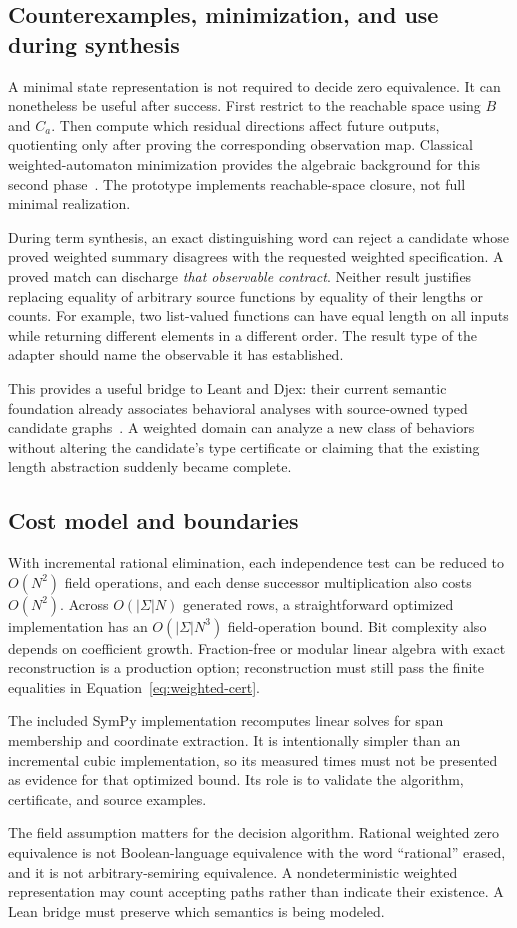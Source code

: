 \subsection{Counterexamples, minimization, and use during synthesis}

A minimal state representation is not required to decide zero equivalence.
It can nonetheless be useful after success. First restrict to the reachable
space using $B$ and $C_a$. Then compute which residual directions affect future
outputs, quotienting only after proving the corresponding observation map.
Classical weighted-automaton minimization provides the algebraic background
for this second phase~\cite{kiefer}. The prototype implements reachable-space
closure, not full minimal realization.

During term synthesis, an exact distinguishing word can reject a candidate
whose proved weighted summary disagrees with the requested weighted
specification. A proved match can discharge \emph{that observable contract}.
Neither result justifies replacing equality of arbitrary source functions by
equality of their lengths or counts. For example, two list-valued functions can
have equal length on all inputs while returning different elements in a
different order. The result type of the adapter should name the observable it
has established.

This provides a useful bridge to Leant and Djex: their current semantic
foundation already associates behavioral analyses with source-owned typed
candidate graphs~\cite{djex-semantic}. A weighted domain can analyze a new class
of behaviors without altering the candidate's type certificate or claiming
that the existing length abstraction suddenly became complete.

\subsection{Cost model and boundaries}

With incremental rational elimination, each independence test can be reduced to
$O(N^2)$ field operations, and each dense successor multiplication also costs
$O(N^2)$. Across $O(|\Sigma|N)$ generated rows, a straightforward optimized
implementation has an $O(|\Sigma|N^3)$ field-operation bound. Bit complexity
also depends on coefficient growth. Fraction-free or modular linear algebra
with exact reconstruction is a production option; reconstruction must still
pass the finite equalities in Equation~\eqref{eq:weighted-cert}.

The included SymPy implementation recomputes linear solves for span membership
and coordinate extraction. It is intentionally simpler than an incremental
cubic implementation, so its measured times must not be presented as evidence
for that optimized bound. Its role is to validate the algorithm, certificate,
and source examples.

The field assumption matters for the decision algorithm. Rational weighted
zero equivalence is not Boolean-language equivalence with the word ``rational''
erased, and it is not arbitrary-semiring equivalence. A nondeterministic
weighted representation may count accepting paths rather than indicate their
existence. A Lean bridge must preserve which semantics is being modeled.
